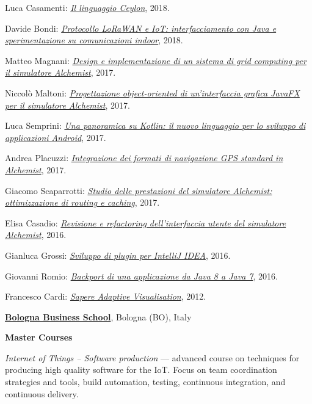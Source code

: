 \begin{outerlist}
\begin{innerlist}
      \item Luca Casamenti: \href{http://amslaurea.unibo.it/16788/}{\textit{Il linguaggio Ceylon}}, 2018.
      \item Davide Bondi: \href{http://amslaurea.unibo.it/15730/}{\textit{Protocollo LoRaWAN e IoT: interfacciamento con Java e sperimentazione su comunicazioni indoor}}, 2018.
      \item Matteo Magnani: \href{http://amslaurea.unibo.it/17133/}{\textit{Design e implementazione di un sistema di grid computing per il simulatore Alchemist}}, 2017.
      \item Niccolò Maltoni: \href{http://amslaurea.unibo.it/14682/}{\textit{Progettazione object-oriented di un'interfaccia grafica JavaFX per il simulatore Alchemist}}, 2017.
      \item Luca Semprini: \href{http://amslaurea.unibo.it/14673/}{\textit{Una panoramica su Kotlin: il nuovo linguaggio per lo sviluppo di applicazioni Android}}, 2017.
      \item Andrea Placuzzi: \href{http://amslaurea.unibo.it/14329/}{\textit{Integrazione dei formati di navigazione GPS standard in Alchemist}}, 2017.
      \item Giacomo Scaparrotti: \href{http://amslaurea.unibo.it/14019/}{\textit{Studio delle prestazioni del simulatore Alchemist: ottimizzazione di routing e caching}}, 2017.
      \item Elisa Casadio: \href{http://amslaurea.unibo.it/12310/}{\textit{Revisione e refactoring dell'interfaccia utente del simulatore Alchemist}}, 2016.
      \item Gianluca Grossi: \href{http://amslaurea.unibo.it/12503/}{\textit{Sviluppo di plugin per IntelliJ IDEA}}, 2016.
      \item Giovanni Romio: \href{http://amslaurea.unibo.it/10481/}{\textit{Backport di una applicazione da Java 8 a Java 7}}, 2016.
      \item Francesco Cardi: \href{http://archive.fo/zMGo8}{\textit{Sapere Adaptive Visualisation}}, 2012.
    \end{innerlist}
\end{outerlist}
\halfblankline

\href{https://www.bbs.unibo.eu/hp/}{\textbf{Bologna Business School}}, Bologna (BO), Italy
\begin{outerlist}
\item[] \textbf{Master Courses} %
    \begin{innerlist}
        \item \textit{Internet of Things -- Software production} --- advanced course on techniques for producing high quality software for the IoT. Focus on team coordination strategies and tools, build automation, testing, continuous integration, and continuous delivery.
\end{innerlist}
\halfblankline
\end{outerlist}

